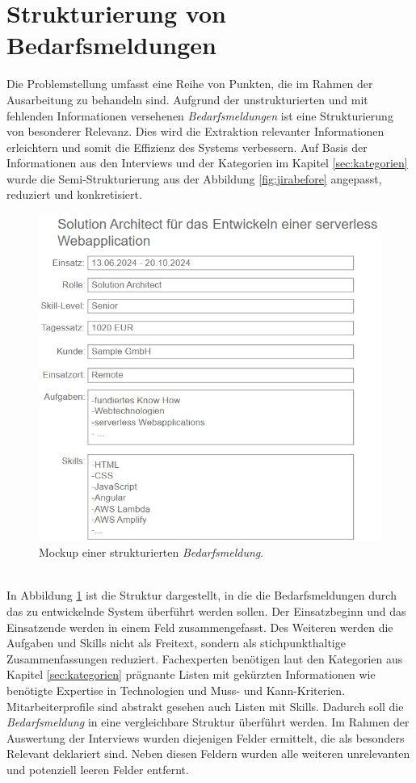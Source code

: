 \section{Strukturierung von Bedarfsmeldungen}
\label{sec:strukturierungbedarfsmeldung}
Die Problemstellung umfasst eine Reihe von Punkten, die im Rahmen der Ausarbeitung zu behandeln sind. Aufgrund der unstrukturierten und mit fehlenden Informationen versehenen \emph{Bedarfsmeldungen} ist eine Strukturierung von besonderer Relevanz. Dies wird die Extraktion relevanter Informationen erleichtern und somit die Effizienz des Systems verbessern. Auf Basis der Informationen aus den Interviews und der Kategorien im Kapitel \ref{sec:kategorien} wurde die Semi-Strukturierung aus der Abbildung \ref{fig:jirabefore} angepasst, reduziert und konkretisiert.
\begin{figure}[H]%
	\centering  
	\includegraphics[scale=1]{Abbildungen/jiraAfter.png}
	\caption{Mockup einer strukturierten \emph{Bedarfsmeldung}.}
	\label{fig:jiraafter}
\end{figure}\mbox{} \\
In Abbildung \ref{fig:jiraafter} ist die Struktur dargestellt, in die die Bedarfsmeldungen durch das zu entwickelnde System überführt werden sollen. Der Einsatzbeginn und das Einsatzende werden in einem Feld zusammengefasst. Des Weiteren werden die Aufgaben und Skills nicht als Freitext, sondern als stichpunkthaltige Zusammenfassungen reduziert. Fachexperten benötigen laut den Kategorien aus Kapitel \ref{sec:kategorien} prägnante Listen mit gekürzten Informationen wie benötigte Expertise in Technologien und Muss- und Kann-Kriterien. Mitarbeiterprofile sind abstrakt gesehen auch Listen mit Skills. Dadurch soll die \emph{Bedarfsmeldung} in eine vergleichbare Struktur überführt werden. Im Rahmen der Auswertung der Interviews wurden diejenigen Felder ermittelt, die als besonders Relevant deklariert sind. Neben diesen Feldern wurden alle weiteren unrelevanten und potenziell leeren Felder entfernt.\\
